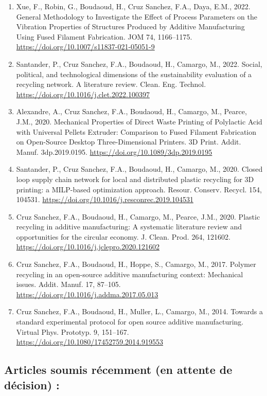 \documentclass[
  12pt,
  oneside]{book}
\begin{document}
\begin{enumerate}
\def\labelenumi{\arabic{enumi}.}
\item
  Xue, F., Robin, G., Boudaoud, H., Cruz Sanchez, F.A., Daya, E.M., 2022. General Methodology to Investigate the Effect of Process Parameters on the Vibration Properties of Structures Produced by Additive Manufacturing Using Fused Filament Fabrication. JOM 74, 1166--1175. \url{https://doi.org/10.1007/s11837-021-05051-9}
\item
  Santander, P., Cruz Sanchez, F.A., Boudaoud, H., Camargo, M., 2022. Social, political, and technological dimensions of the sustainability evaluation of a recycling network. A literature review. Clean. Eng. Technol. \url{https://doi.org/10.1016/j.clet.2022.100397}
\item
  Alexandre, A., Cruz Sanchez, F.A., Boudaoud, H., Camargo, M., Pearce, J.M., 2020. Mechanical Properties of Direct Waste Printing of Polylactic Acid with Universal Pellets Extruder: Comparison to Fused Filament Fabrication on Open-Source Desktop Three-Dimensional Printers. 3D Print. Addit. Manuf. 3dp.2019.0195. \url{https://doi.org/10.1089/3dp.2019.0195}
\item
  Santander, P., Cruz Sanchez, F.A., Boudaoud, H., Camargo, M., 2020. Closed loop supply chain network for local and distributed plastic recycling for 3D printing: a MILP-based optimization approach. Resour. Conserv. Recycl. 154, 104531. \url{https://doi.org/10.1016/j.resconrec.2019.104531}
\item
  Cruz Sanchez, F.A., Boudaoud, H., Camargo, M., Pearce, J.M., 2020. Plastic recycling in additive manufacturing: A systematic literature review and opportunities for the circular economy. J. Clean. Prod. 264, 121602. \url{https://doi.org/10.1016/j.jclepro.2020.121602}
\item
  Cruz Sanchez, F.A., Boudaoud, H., Hoppe, S., Camargo, M., 2017. Polymer recycling in an open-source additive manufacturing context: Mechanical issues. Addit. Manuf. 17, 87--105. \url{https://doi.org/10.1016/j.addma.2017.05.013}
\item
  Cruz Sanchez, F.A., Boudaoud, H., Muller, L., Camargo, M., 2014. Towards a standard experimental protocol for open source additive manufacturing. Virtual Phys. Prototyp. 9, 151--167. \url{https://doi.org/10.1080/17452759.2014.919553}
\end{enumerate}

\hypertarget{articles-soumis-ruxe9cemment-en-attente-de-duxe9cision}{%
\subsection{Articles soumis récemment (en attente de décision) :}\label{articles-soumis-ruxe9cemment-en-attente-de-duxe9cision}}
\end{document}
